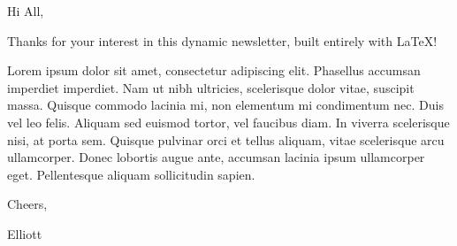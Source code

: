 \begin{page}%
	\Header[%
		title=\inserttitle,
		author=\insertauthor,
		tagline={A procedural \TeX{} newsletter template for professionals},
	]
	
	\Spacer[height=\nlmargin]
	
	\begin{AutoColumns}%
		\begin{Column}[width=0.4]%
			
			\begin{foreword}[%
				image=img/ep.jpg,
			]%
				Hi All, \newline
				
				Thanks for your interest in this dynamic newsletter, built entirely with \LaTeX{}! \newline
				
				Lorem ipsum dolor sit amet, consectetur adipiscing elit. Phasellus accumsan imperdiet imperdiet. Nam ut nibh ultricies, scelerisque dolor vitae, suscipit massa. Quisque commodo lacinia mi, non elementum mi condimentum nec. Duis vel leo felis. Aliquam sed euismod tortor, vel faucibus diam. In viverra scelerisque nisi, at porta sem. Quisque pulvinar orci et tellus aliquam, vitae scelerisque arcu ullamcorper. Donec lobortis augue ante, accumsan lacinia ipsum ullamcorper eget. Pellentesque aliquam sollicitudin sapien. \newline
				
				Cheers,
				
				Elliott
			\end{foreword}%
		\end{Column}%
		\begin{Column}[width=0.6]%
			
			\begin{Updates}
			\end{Updates}
		\end{Column}
	\end{AutoColumns}

	

	\Spacer[height=\nlmargin]

	\Title[alignment=\centering]{Centered heading}
	
	\begin{AutoColumns}%
		\begin{Column}[width=0.3]%
			\begin{tile}[%
				bg=main-bg,
				fg=white,
				width=.3\nlwidth-.5\nlmargin-2cm,
			]%
				\lipsum[1]%
			\end{tile}%
		\end{Column}%
		\begin{Column}[width=0.7]%
			\begin{tile}[%
				bg=main-bg!10,
				fg=main-fg,
				width=.7\nlwidth-.5\nlmargin-2cm,
			]%
				\lipsum[1]%
			\end{tile}%
			

\end{Column}
\end{AutoColumns}
\end{page}
